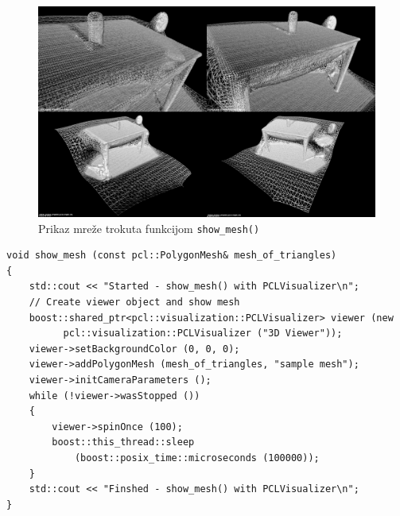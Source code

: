 \begin{figure}[h]
\centering
\includegraphics[scale=0.25]{figures/tablescene-mesh-perspectives.png}
\caption{Prikaz mreže trokuta funkcijom \texttt{show\_mesh()} }
\label{fig:tablesecne-mesh-perspectives}
\end{figure}

\newpage
\begin{lstlisting}[label=lstPrikaz,caption={Izvorni kod funkcije
\texttt{show\_mesh()} }]
void show_mesh (const pcl::PolygonMesh& mesh_of_triangles)
{
    std::cout << "Started - show_mesh() with PCLVisualizer\n";
    // Create viewer object and show mesh
    boost::shared_ptr<pcl::visualization::PCLVisualizer> viewer (new
          pcl::visualization::PCLVisualizer ("3D Viewer"));
    viewer->setBackgroundColor (0, 0, 0);
    viewer->addPolygonMesh (mesh_of_triangles, "sample mesh");
    viewer->initCameraParameters (); 
    while (!viewer->wasStopped ())
    {
        viewer->spinOnce (100); 
        boost::this_thread::sleep 
            (boost::posix_time::microseconds (100000));
    }
    std::cout << "Finshed - show_mesh() with PCLVisualizer\n";
}
\end{lstlisting}




